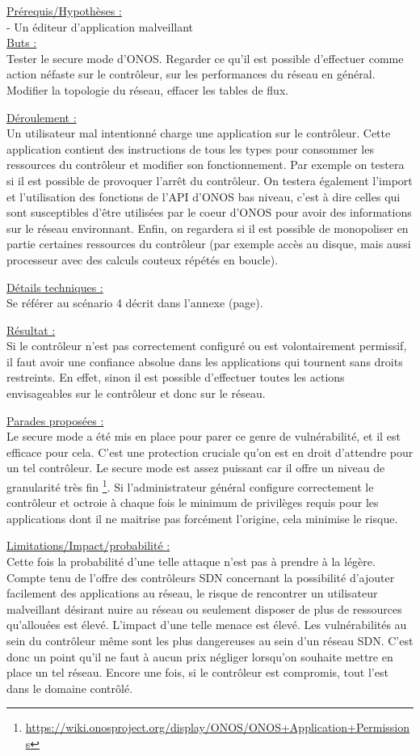 \underline{Prérequis/Hypothèses :}\\
- Un éditeur d’application malveillant\\


\underline{Buts :}\\
Tester le secure mode d’ONOS. Regarder ce qu’il est possible d’effectuer comme action néfaste sur le contrôleur, sur les performances du réseau en général. Modifier la topologie du réseau, effacer les tables de flux.

\underline{Déroulement :}\\
Un utilisateur mal intentionné charge une application sur le contrôleur. Cette application contient des instructions de tous les types pour consommer les ressources du contrôleur et modifier son fonctionnement. Par exemple on testera si il est possible de provoquer l’arrêt du contrôleur. On testera également l’import et l’utilisation des fonctions de l’API d’ONOS bas niveau, c’est à dire celles qui sont susceptibles d’être utilisées par le coeur d’ONOS pour avoir des informations sur le réseau environnant. Enfin, on regardera si il est possible de monopoliser en partie certaines ressources du contrôleur (par exemple accès au disque, mais aussi processeur avec des calculs couteux répétés en boucle).

\underline{Détails techniques :}\\
Se référer au scénario 4 décrit dans l'annexe (page).

\underline{Résultat :}\\
Si le contrôleur n'est pas correctement configuré ou est volontairement permissif, il faut avoir une confiance absolue dans les applications qui tournent sans droits restreints. En effet, sinon il est possible d'effectuer toutes les actions envisageables sur le contrôleur et donc sur le réseau.

\underline{Parades proposées :}\\
Le secure mode a été mis en place pour parer ce genre de vulnérabilité, et il est efficace pour cela. C’est une protection cruciale qu’on est en droit d’attendre pour un tel contrôleur. Le secure mode est assez puissant car il offre un niveau de granularité très fin \footnote{\url{https://wiki.onosproject.org/display/ONOS/ONOS+Application+Permissions}}. Si l'administrateur général configure correctement le contrôleur et octroie à chaque fois le minimum de privilèges requis pour les applications dont il ne maitrise pas forcément l'origine, cela minimise le risque.

\underline{Limitations/Impact/probabilité :}\\
Cette fois la probabilité d’une telle attaque n’est pas à prendre à la légère. Compte tenu de l’offre des contrôleurs SDN concernant la possibilité d’ajouter facilement des applications au réseau, le risque de rencontrer un utilisateur malveillant désirant nuire au réseau ou seulement disposer de plus de ressources qu’allouées est élevé. L’impact d’une telle menace est élevé. Les vulnérabilités au sein du contrôleur même sont les plus dangereuses au sein d’un réseau SDN. C’est donc un point qu’il ne faut à aucun prix négliger lorsqu'on souhaite mettre en place un tel réseau. Encore une fois, si le contrôleur est compromis, tout l'est dans le domaine contrôlé.
